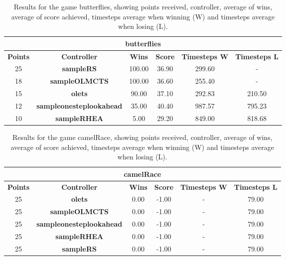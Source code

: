 \begin{table*}[!t]
\begin{center}
\begin{tabular}{|c|c|c|c|c|c|}
\multicolumn{6}{c}{\textbf{butterflies}}\\
\hline
\textbf{Points} & \textbf{Controller} & \textbf{Wins} &  \textbf{Score} & \textbf{Timesteps W} & \textbf{Timesteps L}\\
\hline
25 & \textbf{sampleRS} & 100.00 & 36.90 & 299.60 &  - 
 \\
\hline
18 & \textbf{sampleOLMCTS} & 100.00 & 36.60 & 255.40 &  - 
 \\
\hline
15 & \textbf{olets} & 90.00 & 37.10 & 292.83 & 210.50
 \\
\hline
12 & \textbf{sampleonesteplookahead} & 35.00 & 40.40 & 987.57 & 795.23
 \\
\hline
10 & \textbf{sampleRHEA} & 5.00 & 29.20 & 849.00 & 818.68
 \\
\hline
\end{tabular}
\caption{Results for the game butterflies, showing points received, controller, average of wins, average of score achieved, timesteps average when winning (W) and timesteps average when losing (L).}
\label{tab:weights}
\end{center}
\end{table*}
\begin{table*}[!t]
\begin{center}
\begin{tabular}{|c|c|c|c|c|c|}
\multicolumn{6}{c}{\textbf{camelRace}}\\
\hline
\textbf{Points} & \textbf{Controller} & \textbf{Wins} &  \textbf{Score} & \textbf{Timesteps W} & \textbf{Timesteps L}\\
\hline
25 & \textbf{olets} & 0.00 & -1.00 &  -  & 79.00
 \\
\hline
25 & \textbf{sampleOLMCTS} & 0.00 & -1.00 &  -  & 79.00
 \\
\hline
25 & \textbf{sampleonesteplookahead} & 0.00 & -1.00 &  -  & 79.00
 \\
\hline
25 & \textbf{sampleRHEA} & 0.00 & -1.00 &  -  & 79.00
 \\
\hline
25 & \textbf{sampleRS} & 0.00 & -1.00 &  -  & 79.00
 \\
\hline
\end{tabular}
\caption{Results for the game camelRace, showing points received, controller, average of wins, average of score achieved, timesteps average when winning (W) and timesteps average when losing (L).}
\label{tab:weights}
\end{center}
\end{table*}
